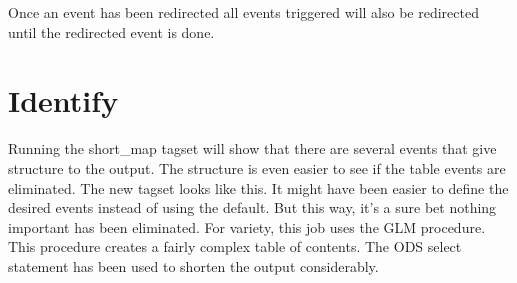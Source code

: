 Once an event has been redirected all events triggered will also be redirected
until the redirected event is done.

\section{Identify}
\label{outline_map}
Running the short\_map tagset will show that there are several events that
give structure to the output.  The structure is even easier to see if the table
events are eliminated.  The new tagset looks like this.
It might have been easier to define the desired events instead of using the
default.  But this way, it's a sure bet nothing important has been eliminated.
For variety, this job uses the GLM procedure.  This procedure creates a fairly
complex table of contents.  The ODS select statement has been used to shorten
the output considerably.

